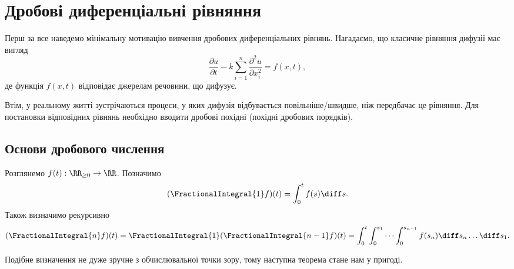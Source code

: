 \section{Дробові диференціальні рівняння}

Перш за все наведемо мінімальну мотивацію вивчення дробових диференціальних рівнянь. Нагадаємо, що класичне рівняння дифузії має вигляд
\begin{equation}
    \label{eq:classical-diffusion}
    \frac{\partial u}{\partial t} - k \sum_{i = 1}^n \frac{\partial^2 u}{\partial x_i^2} = f(x, t),
\end{equation}
де функція $f(x, t)$ відповідає джерелам речовини, що дифузує. \medskip

Втім, у реальному житті зустрічаються процеси, у яких дифузія відбувається повільніше/швидше, ніж передбачає це рівняння. Для постановки відповідних рівнянь необхідно вводити дробові похідні (похідні дробових порядків).

\subsection{Основи дробового числення}

Розглянемо $f(t): \RR_{\ge 0} \to \RR$. Позначимо
\begin{equation}
    (\FractionalIntegral{1} f)(t) = \int_0^t f(s) \diff s.
\end{equation}
Також визначимо рекурсивно 
\begin{equation}
    (\FractionalIntegral{n} f)(t) = \FractionalIntegral{1} (\FractionalIntegral{n - 1} f)(t) = \int_0^t \int_0^{s_1} \cdots \int_0^{s_{n - 1}} f(s_n) \diff s_n \ldots \diff s_1.
\end{equation}

Подібне визначення не дуже зручне з обчислювальної точки зору, тому наступна теорема стане нам у пригоді.

